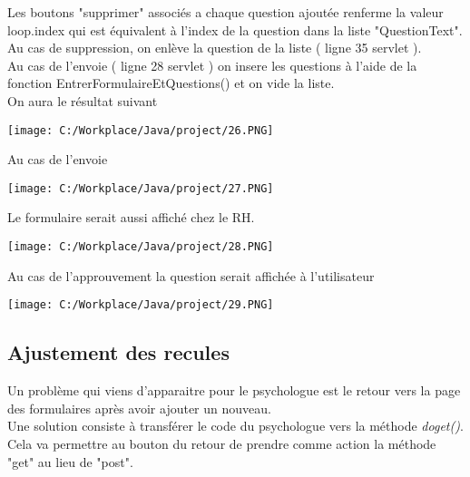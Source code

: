 \documentclass[12]{article}
\begin{document}
Les boutons "supprimer" associés a chaque question ajoutée renferme la valeur loop.index qui est équivalent à l'index de la question dans la liste "QuestionText". Au cas de suppression, on enlève la question de la liste ( ligne 35 servlet ).\\

Au cas de l'envoie ( ligne 28 servlet ) on insere les questions à l'aide de la fonction EntrerFormulaireEtQuestions() et on vide la liste.\\



On aura le résultat suivant 




\begin{center}
\texttt{[image: C:/Workplace/Java/project/26.PNG]}
\end{center}


Au cas de l'envoie 


\begin{center}
\texttt{[image: C:/Workplace/Java/project/27.PNG]}
\end{center}

Le formulaire serait aussi affiché chez le RH.



\begin{center}
\texttt{[image: C:/Workplace/Java/project/28.PNG]}
\end{center}


Au cas de l'approuvement la question serait affichée à l'utilisateur



\begin{center}
\texttt{[image: C:/Workplace/Java/project/29.PNG]}
\end{center}




\subsection{Ajustement des recules}

Un problème qui viens d'apparaitre pour le psychologue est le retour vers la page des formulaires après avoir ajouter un nouveau.\\


Une solution consiste à transférer le code du psychologue vers la méthode \textit{doget()}. Cela va permettre au bouton du retour de prendre comme action la méthode "get" au lieu de "post".\\
\end{document}
